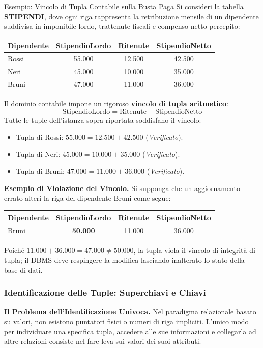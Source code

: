 \documentclass[12pt]{extarticle}
\begin{document}
\begin{cbox}{Esempio: Vincolo di Tupla Contabile sulla Busta Paga}
\noindent Si consideri la tabella \textbf{STIPENDI}, dove ogni riga rappresenta la retribuzione mensile di un dipendente suddivisa in imponibile lordo, trattenute fiscali e compenso netto percepito:
\begin{center}
\small
\begin{tabular}{lccc}
    \toprule
    \textbf{Dipendente} & \textbf{StipendioLordo} & \textbf{Ritenute} & \textbf{StipendioNetto} \\
    \midrule
    Rossi & 55.000 & 12.500 & 42.500 \\
    Neri & 45.000 & 10.000 & 35.000 \\
    Bruni & 47.000 & 11.000 & 36.000 \\
    \bottomrule
\end{tabular}
\end{center}
\medskip
\noindent Il dominio contabile impone un rigoroso \textbf{vincolo di tupla aritmetico}:
$$\text{StipendioLordo} = \text{Ritenute} + \text{StipendioNetto}$$
Tutte le tuple dell'istanza sopra riportata soddisfano il vincolo:
\begin{itemize}
    \item Tupla di Rossi: $55.000 = 12.500 + 42.500$ \quad (\textit{Verificato}).
    \item Tupla di Neri: $45.000 = 10.000 + 35.000$ \quad (\textit{Verificato}).
    \item Tupla di Bruni: $47.000 = 11.000 + 36.000$ \quad (\textit{Verificato}).
\end{itemize}
\medskip
\noindent \textbf{Esempio di Violazione del Vincolo.} Si supponga che un aggiornamento errato alteri la riga del dipendente Bruni come segue:
\begin{center}
\small
\begin{tabular}{lccc}
    \toprule
    \textbf{Dipendente} & \textbf{StipendioLordo} & \textbf{Ritenute} & \textbf{StipendioNetto} \\
    \midrule
    Bruni & \textbf{50.000} & 11.000 & 36.000 \\
    \bottomrule
\end{tabular}
\end{center}
Poiché $11.000 + 36.000 = 47.000 \ne 50.000$, la tupla viola il vincolo di integrità di tupla; il DBMS deve respingere la modifica lasciando inalterato lo stato della base di dati.
\end{cbox}

\subsubsection{Identificazione delle Tuple: Superchiavi e Chiavi}
\noindent \textbf{Il Problema dell'Identificazione Univoca.} Nel paradigma relazionale basato su valori, non esistono puntatori fisici o numeri di riga impliciti. L'unico modo per individuare una specifica tupla, accedere alle sue informazioni e collegarla ad altre relazioni consiste nel fare leva sui valori dei suoi attributi.
\end{document}
